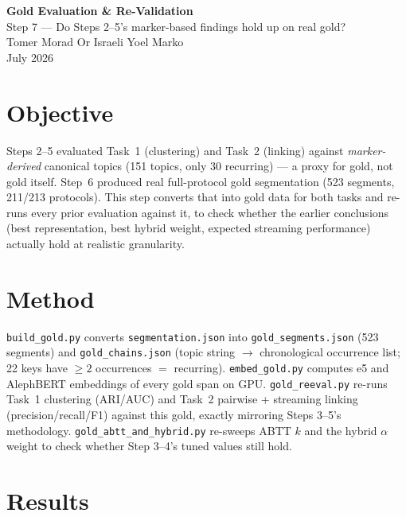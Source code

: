 \documentclass[11pt,a4paper]{article}
\begin{document}
\begin{center}
  {\LARGE \textbf{Gold Evaluation \& Re-Validation}}\\[0.3em]
  {\large Step 7 --- Do Steps 2--5's marker-based findings hold up on real gold?}\\[0.6em]
  {\normalsize Tomer Morad \quad Or Israeli \quad Yoel Marko}\\
  {\normalsize July 2026}
\end{center}

\vspace{0.5em}

\section{Objective}

Steps 2--5 evaluated Task~1 (clustering) and Task~2 (linking) against \emph{marker-derived}
canonical topics (151 topics, only 30 recurring) --- a proxy for gold, not gold itself. Step~6
produced real full-protocol gold segmentation (523 segments, 211/213 protocols). This step
converts that into gold data for both tasks and re-runs every prior evaluation against it, to
check whether the earlier conclusions (best representation, best hybrid weight, expected
streaming performance) actually hold at realistic granularity.

\section{Method}

\texttt{build\_gold.py} converts \texttt{segmentation.json} into \texttt{gold\_segments.json}
(523 segments) and \texttt{gold\_chains.json} (topic string $\to$ chronological occurrence
list; 22 keys have $\ge 2$ occurrences $=$ recurring). \texttt{embed\_gold.py} computes e5 and
AlephBERT embeddings of every gold span on GPU. \texttt{gold\_reeval.py} re-runs Task~1
clustering (ARI/AUC) and Task~2 pairwise + streaming linking (precision/recall/F1) against this
gold, exactly mirroring Steps 3--5's methodology. \texttt{gold\_abtt\_and\_hybrid.py}
re-sweeps ABTT $k$ and the hybrid $\alpha$ weight to check whether Step 3--4's tuned values
still hold.

\section{Results}
\end{document}
